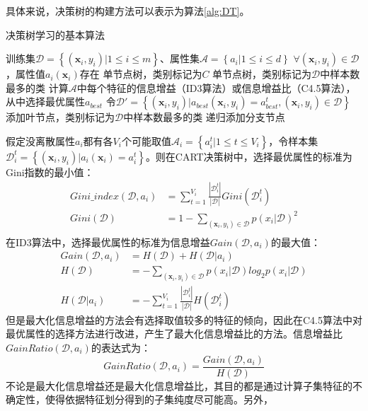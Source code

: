 \documentclass[a4paper]{ctexart}
\renewcommand{\heiti}{\CJKfamily{heiti}\fontspec{Times New Roman}}
\newcommand{\mycaptionfont}{\heiti\zihao{5}}
\begin{document}
具体来说，决策树的构建方法可以表示为算法\ref{alg:DT}\cite{RN90}。
\begin{algorithm}[htbp]
	\caption{\mycaptionfont 决策树学习的基本算法}
	\label{alg:DT}
	\begin{algorithmic}[1]
		\Require 训练集$\mathcal{D}=\left\{(\bm x_i,y_i)|1\leq i\leq m\right\}$、属性集$\mathcal{A}=\left\{a_i|1\leq i\leq d\right\}$
		\Ensure $\forall (\bm x_i,y_i)\in \mathcal{D}$，属性值$a_i(\bm x_i)$存在
		\State \Return 单节点树，类别标记为$C$
		\EndIf
		\State \Return 单节点树，类别标记为$\mathcal{D}$中样本数最多的类
		\EndIf
		\State 计算$\mathcal{A}$中每个特征的信息增益（ID3算法）或信息增益比（C4.5算法），从中选择最优属性$a_{best}$
		\State 令$\mathcal{D}'=\left\{(\bm x_i,y_i)|a_{best}(\bm x_i,y_i)=a_{best}^t,(\bm x_i,y_i)\in \mathcal{D}\right\}$
		\State 添加叶节点，类别标记为$\mathcal{D}$中样本数最多的类
		\Else
		\State 递归添加分支节点
		\EndIf
		\EndFor
		\EndFunction
	\end{algorithmic}
\end{algorithm}

假定没离散属性$a_i$都有各$V_i$个可能取值$\mathcal A_i=\left\{a_i^t|1\leq t\leq V_i\right\}$，令样本集$\mathcal D_i^t=\left\{(\bm x_i,y_i)|a_i(\bm x_i)=a_i^t\right\}$。则在CART决策树中，选择最优属性的标准为Gini指数的最小值\cite{RN90}：
\begin{equation}
	\begin{split}
		Gini\_index(\mathcal{D},a_i)&=\sum_{t=1}^{V_i}\frac{|\mathcal D_i^t|}{|\mathcal{D}|}Gini(\mathcal D_i^t)\\
		Gini(\mathcal{D})&=1-\sum_{(\bm x_i,y_i)\in \mathcal{D}}p(x_i|\mathcal{D})^2\\
	\end{split}
\end{equation}
在ID3算法中，选择最优属性的标准为信息增益$Gain(\mathcal{D},a_i)$的最大值\cite{RN90}：
\begin{equation}
	\begin{split}
		Gain(\mathcal{D},a_i)&=H(\mathcal{D})+H(\mathcal{D}|a_i)\\
		H(\mathcal{D})&=-\sum_{(\bm x_i,y_i)\in \mathcal{D}}p(x_i|\mathcal{D}) log_{2}p(x_i|\mathcal{D})\\
		H(\mathcal{D}|a_i)&=-\sum_{t=1}^{V_i}\frac{|\mathcal D_i^t|}{|\mathcal{D}|}H(\mathcal D_i^t)
	\end{split}
\end{equation}
但是最大化信息增益的方法会有选择取值较多的特征的倾向，因此在C4.5算法中对最优属性的选择方法进行改进，产生了最大化信息增益比的方法。信息增益比$GainRatio(\mathcal{D},a_i)$的表达式为\cite{RN90}：
\begin{equation}
	GainRatio(\mathcal{D},a_i)=\frac{Gain(\mathcal{D},a_i)}{H(\mathcal{D})}
\end{equation}
不论是最大化信息增益还是最大化信息增益比，其目的都是通过计算子集特征的不确定性，使得依据特征划分得到的子集纯度尽可能高。另外，
\end{document}
